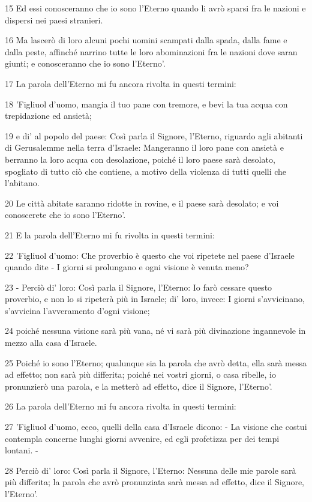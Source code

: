 \par 15 Ed essi conosceranno che io sono l'Eterno quando li avrò sparsi fra le nazioni e dispersi nei paesi stranieri.
\par 16 Ma lascerò di loro alcuni pochi uomini scampati dalla spada, dalla fame e dalla peste, affinché narrino tutte le loro abominazioni fra le nazioni dove saran giunti; e conosceranno che io sono l'Eterno'.
\par 17 La parola dell'Eterno mi fu ancora rivolta in questi termini:
\par 18 'Figliuol d'uomo, mangia il tuo pane con tremore, e bevi la tua acqua con trepidazione ed ansietà;
\par 19 e di' al popolo del paese: Così parla il Signore, l'Eterno, riguardo agli abitanti di Gerusalemme nella terra d'Israele: Mangeranno il loro pane con ansietà e berranno la loro acqua con desolazione, poiché il loro paese sarà desolato, spogliato di tutto ciò che contiene, a motivo della violenza di tutti quelli che l'abitano.
\par 20 Le città abitate saranno ridotte in rovine, e il paese sarà desolato; e voi conoscerete che io sono l'Eterno'.
\par 21 E la parola dell'Eterno mi fu rivolta in questi termini:
\par 22 'Figliuol d'uomo: Che proverbio è questo che voi ripetete nel paese d'Israele quando dite - I giorni si prolungano e ogni visione è venuta meno?
\par 23 - Perciò di' loro: Così parla il Signore, l'Eterno: Io farò cessare questo proverbio, e non lo si ripeterà più in Israele; di' loro, invece: I giorni s'avvicinano, s'avvicina l'avveramento d'ogni visione;
\par 24 poiché nessuna visione sarà più vana, né vi sarà più divinazione ingannevole in mezzo alla casa d'Israele.
\par 25 Poiché io sono l'Eterno; qualunque sia la parola che avrò detta, ella sarà messa ad effetto; non sarà più differita; poiché nei vostri giorni, o casa ribelle, io pronunzierò una parola, e la metterò ad effetto, dice il Signore, l'Eterno'.
\par 26 La parola dell'Eterno mi fu ancora rivolta in questi termini:
\par 27 'Figliuol d'uomo, ecco, quelli della casa d'Israele dicono: - La visione che costui contempla concerne lunghi giorni avvenire, ed egli profetizza per dei tempi lontani. -
\par 28 Perciò di' loro: Così parla il Signore, l'Eterno: Nessuna delle mie parole sarà più differita; la parola che avrò pronunziata sarà messa ad effetto, dice il Signore, l'Eterno'.

